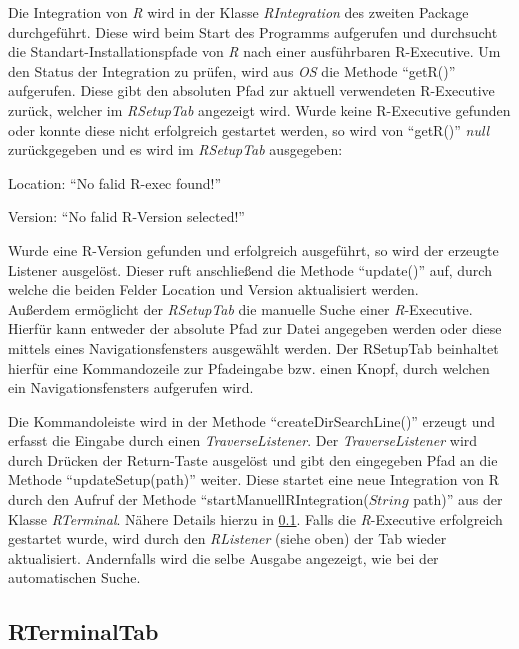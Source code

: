 \documentclass[a4paper, 12pt]{report} %
\begin{document}
Die Integration von \textit{R} wird in der Klasse \textit{RIntegration} des zweiten Package durchgeführt. Diese wird beim Start des Programms aufgerufen und durchsucht die Standart-Installationspfade von \textit{R} nach einer ausführbaren R-Executive.
 Um den Status der Integration zu prüfen, wird aus \textit{OS} die Methode "`getR()"' aufgerufen. Diese gibt den absoluten Pfad zur aktuell verwendeten R-Executive zurück, welcher im \textit{RSetupTab} angezeigt wird.
Wurde keine R-Executive gefunden oder konnte diese nicht erfolgreich gestartet werden, so wird von "`getR()"' \textit{null} zurückgegeben und es wird im \textit{RSetupTab} ausgegeben:  
\begin{center}
Location: "`No falid R-exec found!"'

Version: "`No falid R-Version selected!"'
\end{center}

Wurde eine R-Version gefunden und erfolgreich ausgeführt, so wird der erzeugte Listener ausgelöst. Dieser ruft anschließend die Methode "`update()"' auf, durch welche die beiden Felder Location und Version aktualisiert werden.\\

Außerdem ermöglicht der \textit{RSetupTab} die manuelle Suche einer \textit{R}-Executive. Hierfür kann entweder der absolute Pfad zur Datei angegeben werden oder diese mittels eines Navigationsfensters ausgewählt werden.
Der RSetupTab beinhaltet hierfür eine Kommandozeile zur Pfadeingabe bzw. einen Knopf, durch welchen ein Navigationsfensters aufgerufen wird.

Die Kommandoleiste wird in der Methode "`createDirSearchLine()"' erzeugt und erfasst die Eingabe durch einen \textit{TraverseListener}. Der \textit{TraverseListener} wird durch Drücken der Return-Taste ausgelöst und gibt den eingegeben Pfad an die Methode "`updateSetup(path)"' weiter. Diese startet eine neue Integration von R durch den Aufruf der Methode "`startManuellRIntegration($String$ path)"' aus der Klasse \textit{RTerminal}. Nähere Details hierzu in \ref{RTerminal}. Falls die \textit{R}-Executive erfolgreich gestartet wurde, wird durch den \textit{RListener} (siehe oben) der Tab wieder aktualisiert. Andernfalls wird die selbe Ausgabe angezeigt, wie bei der automatischen Suche.

\subsection{RTerminalTab} \label{RTerminal}
\end{document}
